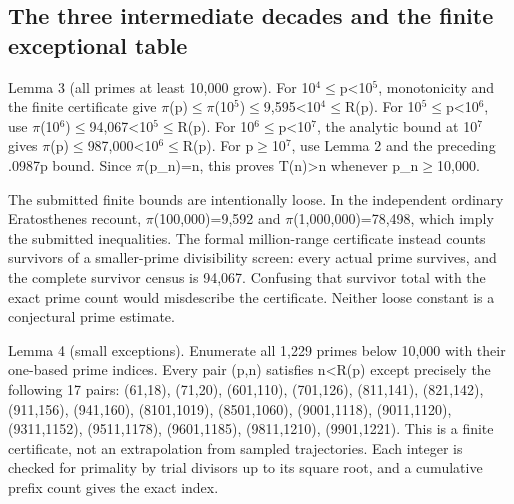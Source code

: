 \documentclass[11pt,a4paper]{article}
\begin{document}
\subsection{The three intermediate decades and the finite exceptional table}
Lemma 3 (all primes at least 10,000 grow). For 10\ensuremath{^4}\ensuremath{\leq}p<10\ensuremath{^5}, monotonicity and the finite certificate give \ensuremath{\pi}(p)\ensuremath{\leq}\ensuremath{\pi}(10\ensuremath{^5})\ensuremath{\leq}9,595<10\ensuremath{^4}\ensuremath{\leq}R(p). For 10\ensuremath{^5}\ensuremath{\leq}p<10\ensuremath{^6}, use \ensuremath{\pi}(10\ensuremath{^6})\ensuremath{\leq}94,067<10\ensuremath{^5}\ensuremath{\leq}R(p). For 10\ensuremath{^6}\ensuremath{\leq}p<10\ensuremath{^7}, the analytic bound at 10\ensuremath{^7} gives \ensuremath{\pi}(p)\ensuremath{\leq}987,000<10\ensuremath{^6}\ensuremath{\leq}R(p). For p\ensuremath{\geq}10\ensuremath{^7}, use Lemma 2 and the preceding .0987p bound. Since \ensuremath{\pi}(p\_n)=n, this proves T(n)>n whenever p\_n\ensuremath{\geq}10,000.

The submitted finite bounds are intentionally loose. In the independent ordinary Eratosthenes recount, \ensuremath{\pi}(100,000)=9,592 and \ensuremath{\pi}(1,000,000)=78,498, which imply the submitted inequalities. The formal million-range certificate instead counts survivors of a smaller-prime divisibility screen: every actual prime survives, and the complete survivor census is 94,067. Confusing that survivor total with the exact prime count would misdescribe the certificate. Neither loose constant is a conjectural prime estimate.

Lemma 4 (small exceptions). Enumerate all 1,229 primes below 10,000 with their one-based prime indices. Every pair (p,n) satisfies n<R(p) except precisely the following 17 pairs: (61,18), (71,20), (601,110), (701,126), (811,141), (821,142), (911,156), (941,160), (8101,1019), (8501,1060), (9001,1118), (9011,1120), (9311,1152), (9511,1178), (9601,1185), (9811,1210), (9901,1221). This is a finite certificate, not an extrapolation from sampled trajectories. Each integer is checked for primality by trial divisors up to its square root, and a cumulative prefix count gives the exact index.
\end{document}
